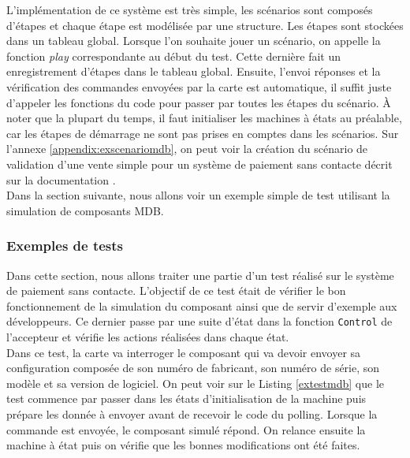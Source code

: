 \documentclass[a4paper]{article}
\begin{document}
L'implémentation de ce système est très simple, les scénarios sont composés
d'étapes et chaque étape est modélisée par une structure. Les étapes sont
stockées dans un tableau global. Lorsque l'on souhaite jouer un scénario, on
appelle la fonction \textit{play} correspondante au début du test. Cette dernière
fait un enregistrement d'étapes dans le tableau global. Ensuite, l'envoi
réponses et la vérification des commandes envoyées par la carte est automatique,
il suffit juste d'appeler les fonctions du code pour passer par toutes les
étapes du scénario. À noter que la plupart du temps, il faut initialiser les
machines à états au préalable, car les étapes de démarrage ne sont pas prises en
comptes dans les scénarios. Sur l'annexe \ref{appendix:exscenariomdb}, on peut
voir la création du scénario de validation d'une vente simple pour un système de
paiement sans contacte décrit sur la documentation \cite[169]{mdbdoc}.\\

Dans la section suivante, nous allons voir un exemple simple de test
utilisant la simulation de composants MDB.

\subsubsection{Exemples de tests}

Dans cette section, nous allons traiter une partie d'un test réalisé sur le
système de paiement sans contacte. L'objectif de ce test était de vérifier le
bon fonctionnement de la simulation du composant ainsi que de servir d'exemple
aux développeurs. Ce dernier passe par une suite d'état dans la fonction
\verb|Control| de l'accepteur et vérifie les actions réalisées dans chaque
état.\\

Dans ce test, la carte va interroger le composant qui va devoir envoyer sa
configuration composée de son numéro de fabricant, son numéro de série, son
modèle et sa version de logiciel. On peut voir sur le Listing \ref{extestmdb}
que le test commence par passer dans les états d'initialisation de la machine
puis prépare les donnée à envoyer avant de recevoir le code du polling. Lorsque
la commande est envoyée, le composant simulé répond. On relance ensuite la
machine à état puis on vérifie que les bonnes modifications ont été faites.
\end{document}
